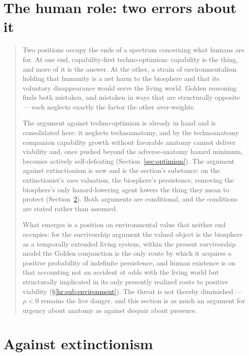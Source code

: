 \section{The human role: two errors about it}\label{sec:errors}


\begin{quote}\small
Two positions occupy the ends of a spectrum concerning what humans are
for. At one end, capability-first techno-optimism: capability is the
thing, and more of it is the answer. At the other, a strain of environmentalism holding
that humanity is a net harm to the biosphere and that its voluntary
disappearance would serve the living world. Golden reasoning finds both
mistaken, and mistaken in ways that are structurally opposite --- each
neglects exactly the factor the other over-weights.

The argument against techno-optimism is already in hand and is
consolidated here: it neglects technoanatomy, and by
the technoanatomy companion \cite{GoldenTechnoanatomy} capability growth without favorable
anatomy cannot deliver viability and, once pushed beyond the
adverse-anatomy hazard minimum, becomes actively self-defeating
(Section~\ref{sec:optimism}). The argument against extinctionism is new and
is the section's substance: on the extinctionist's \emph{own} valuation, the biosphere's persistence, removing the biosphere's only
hazard-lowering agent lowers the thing they mean to protect
(Section~\ref{sec:extinction}). Both arguments are conditional, and the
conditions are stated rather than assumed.

What emerges is a position on environmental value that neither end
occupies: for the survivorship argument the valued object is the
biosphere as a temporally extended living system, within the present survivorship model the Golden conjunction is
the only route by which it acquires a positive probability of
indefinite persistence, and human
existence is on that accounting not an accident at odds with the living
world but structurally implicated in its only presently realized route
to positive viability
(\S\ref{hr:sub:environment}). The threat is not thereby diminished ---
$\rho<0$ remains the live danger, and this section is as much an
argument for urgency about anatomy as against despair about presence.
\end{quote}





\section{Against extinctionism}\label{sec:extinction}


